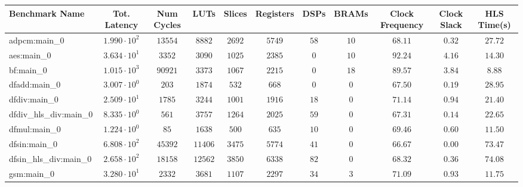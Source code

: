 \begin{tabular}{|l|c|c|c|c|c|c|c|c|c|c|}
\hline
Benchmark Name          & Tot. Latency           & Num Cycles & LUTs      & Slices    & Registers & DSPs    & BRAMs   & Clock Frequency & Clock Slack & HLS Time(s) \\
\hline
adpcm:main\_0           & $ 1.990 \cdot 10^{2} $ & $ 13554  $ & $ 8882  $ & $ 2692  $ & $ 5749  $ & $ 58  $ & $ 10  $ & $ 68.11       $ & $ 0.32    $ & $ 27.72   $ \\
aes:main\_0             & $ 3.634 \cdot 10^{1} $ & $ 3352   $ & $ 3090  $ & $ 1025  $ & $ 2385  $ & $ 0   $ & $ 10  $ & $ 92.24       $ & $ 4.16    $ & $ 14.30   $ \\
bf:main\_0              & $ 1.015 \cdot 10^{3} $ & $ 90921  $ & $ 3373  $ & $ 1067  $ & $ 2215  $ & $ 0   $ & $ 18  $ & $ 89.57       $ & $ 3.84    $ & $ 8.88    $ \\
dfadd:main\_0           & $ 3.007 \cdot 10^{0} $ & $ 203    $ & $ 1874  $ & $ 532   $ & $ 668   $ & $ 0   $ & $ 0   $ & $ 67.50       $ & $ 0.19    $ & $ 28.95   $ \\
dfdiv:main\_0           & $ 2.509 \cdot 10^{1} $ & $ 1785   $ & $ 3244  $ & $ 1001  $ & $ 1916  $ & $ 18  $ & $ 0   $ & $ 71.14       $ & $ 0.94    $ & $ 21.40   $ \\
dfdiv\_hls\_div:main\_0 & $ 8.335 \cdot 10^{0} $ & $ 561    $ & $ 3757  $ & $ 1264  $ & $ 2025  $ & $ 59  $ & $ 0   $ & $ 67.31       $ & $ 0.14    $ & $ 22.65   $ \\
dfmul:main\_0           & $ 1.224 \cdot 10^{0} $ & $ 85     $ & $ 1638  $ & $ 500   $ & $ 635   $ & $ 10  $ & $ 0   $ & $ 69.46       $ & $ 0.60    $ & $ 11.50   $ \\
dfsin:main\_0           & $ 6.808 \cdot 10^{2} $ & $ 45392  $ & $ 11406 $ & $ 3475  $ & $ 5774  $ & $ 41  $ & $ 0   $ & $ 66.67       $ & $ 0.00    $ & $ 73.47   $ \\
dfsin\_hls\_div:main\_0 & $ 2.658 \cdot 10^{2} $ & $ 18158  $ & $ 12562 $ & $ 3850  $ & $ 6338  $ & $ 82  $ & $ 0   $ & $ 68.32       $ & $ 0.36    $ & $ 74.08   $ \\
gsm:main\_0             & $ 3.280 \cdot 10^{1} $ & $ 2332   $ & $ 3681  $ & $ 1107  $ & $ 2297  $ & $ 34  $ & $ 3   $ & $ 71.09       $ & $ 0.93    $ & $ 11.75   $ \\

\end{tabular}
